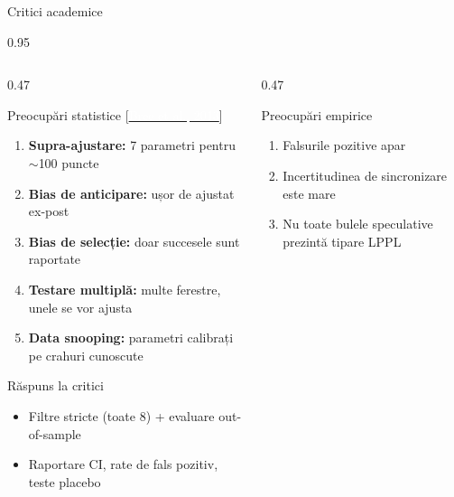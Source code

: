 \documentclass[9pt, aspectratio=169, t]{beamer}
\begin{document}
\begin{frame}{Critici academice}
    \begin{cminipage}{0.95\textwidth}
    {\scriptsize
    \begin{columns}[T]
        \begin{column}{0.47\textwidth}
            \begin{alertblock}{Preocupări statistice {\scriptsize[\href{https://doi.org/10.1080/14697688.2011.607467}{\textcolor{white}{Bree et al., 2013}}]}}
                \begin{enumerate}\setlength{\itemsep}{0pt}
                    \item \textbf{Supra-ajustare:} 7 parametri pentru $\sim$100 puncte
                    \item \textbf{Bias de anticipare:} ușor de ajustat ex-post
                    \item \textbf{Bias de selecție:} doar succesele sunt raportate
                    \item \textbf{Testare multiplă:} multe ferestre, unele se vor ajusta
                    \item \textbf{Data snooping:} parametri calibrați pe crahuri cunoscute
                \end{enumerate}
            \end{alertblock}
            \vspace{-2mm}
            \begin{block}{Răspuns la critici}
                \begin{itemize}\setlength{\itemsep}{0pt}
                    \item Filtre stricte (toate 8) + evaluare out-of-sample
                    \item Raportare CI, rate de fals pozitiv, teste placebo
                \end{itemize}
            \end{block}
        \end{column}
        \begin{column}{0.47\textwidth}
            \begin{alertblock}{Preocupări empirice}
                \begin{enumerate}\setlength{\itemsep}{0pt}
                    \item Falsurile pozitive apar
                    \item Incertitudinea de sincronizare este mare
                    \item Nu toate bulele speculative prezintă tipare LPPL

\end{enumerate}
\end{alertblock}
\end{column}
\end{columns}}
\end{cminipage}
\end{frame}
\end{document}
